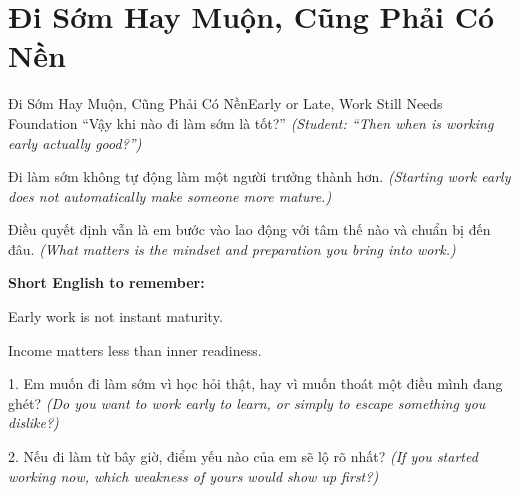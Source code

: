 \section{Đi Sớm Hay Muộn, Cũng Phải Có Nền}
\begin{truyen}{Đi Sớm Hay Muộn, Cũng Phải Có Nền}{Early or Late, Work Still Needs Foundation}
 ``Vậy khi nào đi làm sớm là tốt?''
\textit{(Student: ``Then when is working early actually good?'')}

\end{truyen}

\begin{baihoc}
Đi làm sớm không tự động làm một người trưởng thành hơn.
\textit{(Starting work early does not automatically make someone more mature.)}

Điều quyết định vẫn là em bước vào lao động với tâm thế nào và chuẩn bị đến đâu.
\textit{(What matters is the mindset and preparation you bring into work.)}
\end{baihoc}

\begin{ghinhoanh}
\textbf{Short English to remember:}

Early work is not instant maturity.

Income matters less than inner readiness.
\end{ghinhoanh}

\begin{tuhocnhanh}
1. Em muốn đi làm sớm vì học hỏi thật, hay vì muốn thoát một điều mình đang ghét? \textit{(Do you want to work early to learn, or simply to escape something you dislike?)}

2. Nếu đi làm từ bây giờ, điểm yếu nào của em sẽ lộ rõ nhất? \textit{(If you started working now, which weakness of yours would show up first?)}
\end{tuhocnhanh}

\ngancach